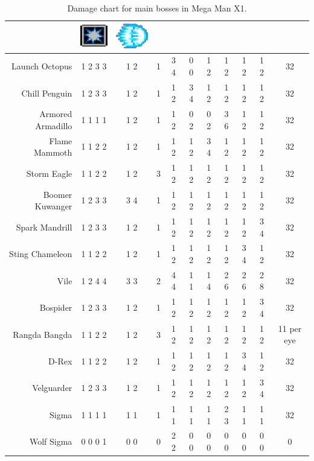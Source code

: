 \begin{table}[htp]
{\begin{tabular}{r *{10}{c}}
		&{\includegraphics[scale=0.5]{figures/X1/Chill_penguin/Shot_I.png}} &{\includegraphics[scale=0.5]{figures/X1/weapons/Hadouken_sprite.png}}\\
		\midrule
		Launch Octopus&	 	1 2 3 3 & 1 2& 1 & 3 4& 0 0& 1 2& 1 2& 1 2& 1 2& 32\\
		Chill Penguin&	 	1 2 3 3 & 1 2& 1 & 1 2& 3 4& 1 2& 1 2& 1 2& 1 2& 32\\
		Armored Armadillo& 	1 1 1 1 & 1 2& 1 & 1 2& 0 2& 0 2& 3 6& 1 2& 1 2& 32\\
		Flame Mammoth& 		1 1 2 2 & 1 2& 1 & 1 2& 1 2& 3 4& 1 2& 1 2& 1 2& 32\\
		Storm Eagle& 		1 1 2 2 & 1 2& 3 & 1 2& 1 2& 1 2& 1 2& 1 2& 1 2& 32\\
		Boomer Kuwanger&	1 2 3 3 & 3 4& 1 & 1 2& 1 2& 1 2& 1 2& 1 2& 1 2& 32\\
		Spark Mandrill&		1 2 3 3 & 1 2& 1 & 1 2& 1 2& 1 2& 1 2& 1 2& 3 4& 32\\
		Sting Chameleon&	1 1 2 2 & 1 2& 1 & 1 2& 1 2& 1 2& 1 2& 3 4& 1 2& 32\\
		Vile &				1 2 4 4 & 3 3& 2 & 4 4& 1 1& 1 4& 2 6& 2 6& 2 8& 32\\
		Bospider&			1 2 3 3 & 1 2& 1 & 1 2& 1 2& 1 2& 1 2& 1 2& 3 4& 32\\
		Rangda Bangda&		1 1 2 2 & 1 2& 3 & 1 2& 1 2& 1 2& 1 2& 1 2& 1 2& 11 per eye\\
		D-Rex&				1 1 2 2 & 1 2& 1 & 1 2& 1 2& 1 2& 1 2& 3 4& 1 2& 32\\
		Velguarder&			1 2 3 3 & 1 2& 1 & 1 2& 1 2& 1 2& 1 2& 1 2& 3 4& 32\\
		Sigma&				1 1 1 1 & 1 1& 1 & 1 1& 1 1& 1 1& 2 3& 1 1& 1 1& 32\\
		Wolf Sigma&			0 0 0 1 & 0 0& 0 & 2 2& 0 0& 0 0& 0 0& 0 0& 0 0& 0\\
		\bottomrule
	\end{tabular}
	}	
	\caption{Damage chart for main bosses in Mega Man X1.}
	
\end{table}
